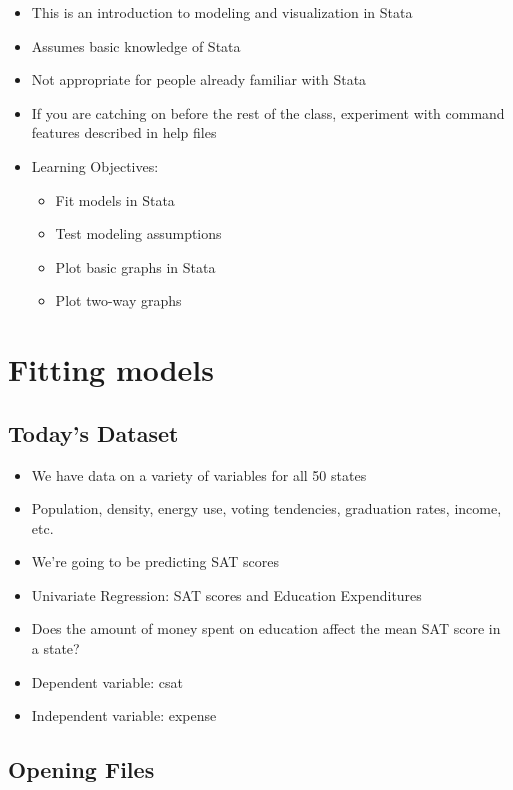 \documentclass[]{book}
\providecommand{\tightlist}{%
  \setlength{\itemsep}{0pt}\setlength{\parskip}{0pt}}
\begin{document}
\begin{itemize}
\tightlist
\item
  This is an introduction to modeling and visualization in Stata
\item
  Assumes basic knowledge of Stata
\item
  Not appropriate for people already familiar with Stata
\item
  If you are catching on before the rest of the class, experiment with command features described in help files
\item
  Learning Objectives:

  \begin{itemize}
  \tightlist
  \item
    Fit models in Stata
  \item
    Test modeling assumptions
  \item
    Plot basic graphs in Stata
  \item
    Plot two-way graphs
  \end{itemize}
\end{itemize}

\hypertarget{fitting-models}{%
\section{Fitting models}\label{fitting-models}}

\hypertarget{todays-dataset}{%
\subsection{Today's Dataset}\label{todays-dataset}}

\begin{itemize}
\tightlist
\item
  We have data on a variety of variables for all 50 states
\item
  Population, density, energy use, voting tendencies, graduation rates, income, etc.
\item
  We're going to be predicting SAT scores
\item
  Univariate Regression: SAT scores and Education Expenditures
\item
  Does the amount of money spent on education affect the mean SAT score in a state?
\item
  Dependent variable: csat
\item
  Independent variable: expense
\end{itemize}

\hypertarget{opening-files-1}{%
\subsection{Opening Files}\label{opening-files-1}}
\end{document}
